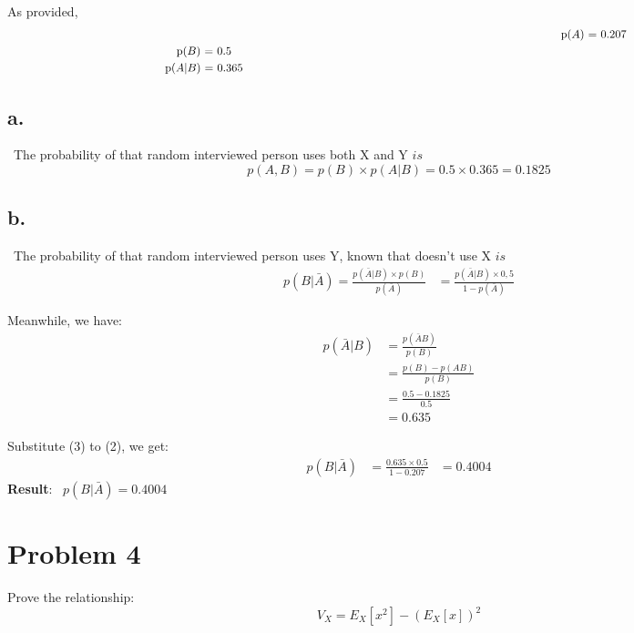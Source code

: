 \documentclass{article}
\begin{document}
As provided, 
\begin{align*}

        &  \centerline{p($A$) = 0.207} \\
            \centerline{p($B$) = 0.5} \\
            \centerline{p($A|B$) = 0.365} \\
\end{align*}
\subsection*{a.}
\ The probability of that random interviewed person uses both X and Y $is$
$$
p(A,B) = p(B)\times p(A|B) = 0.5\times 0.365 = 0.1825 
$$
\subsection*{b.}
\ The probability of that random interviewed person uses Y, known that doesn't use X $is$
\begin{equation}
    \begin{split}
    p(B|\bar{A}) = \frac{p(\bar{A}|B)\times p(B)}{p(\bar{A})} 
    & = \frac{p(\bar{A}|B)\times 0,5}{1 - p(\bar{A})} 
    \end{split}
\end{equation}

Meanwhile, we have: \\
\begin{equation}
    \begin{split}
    p(\bar{A}|B) & = \frac{p(\bar{A}B)}{p(B)} \\
                 & = \frac{p(B) - p(AB)}{p(B)} \\
                 & = \frac{0.5 - 0.1825}{0.5} \\
                 & = 0.635 
    \end{split}
\end{equation}

Substitute (3) to (2), we get:
\begin{equation}
    \begin{split}
    p(B|\bar{A}) & = \frac{0.635\times 0.5}{1 - 0.207}
                 & = 0.4004
    \end{split}
\end{equation}
\textbf{Result}: \ 
$ p(B|\bar{A}) = 0.4004 $




\section*{Problem 4}
Prove the relationship:
$$
V_X = E_X[x^2] - (E_X[x])^2
$$
\end{document}
